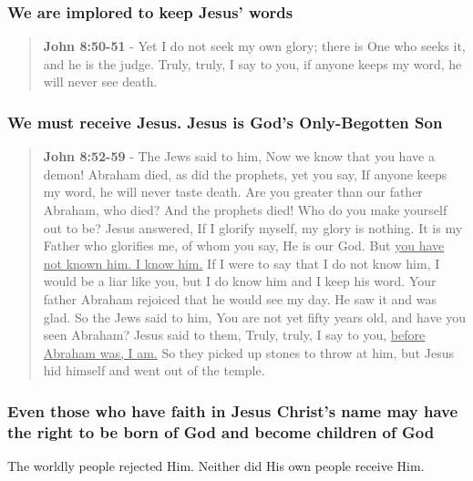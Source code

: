 \documentclass[11pt]{article}
\begin{document}
\subsubsection{We are implored to keep Jesus' words}
\label{sec:orgd95e0c0}
\begin{quote}
\textbf{John 8:50-51} - Yet I do not seek my own glory; there is One who seeks it, and he is the judge. Truly, truly, I say to you, if anyone keeps my word, he will never see death.
\end{quote}

\subsubsection{We must receive Jesus. Jesus is God's Only-Begotten Son}
\label{sec:orgecdaece}
\begin{quote}
\textbf{John 8:52-59} - The Jews said to him, Now we know that you have a demon! Abraham died, as did the prophets, yet you say, If anyone keeps my word, he will never taste death. Are you greater than our father Abraham, who died? And the prophets died! Who do you make yourself out to be? Jesus answered, If I glorify myself, my glory is nothing. It is my Father who glorifies me, of whom you say, He is our God. But \uline{you have not known him. I know him.} If I were to say that I do not know him, I would be a liar like you, but I do know him and I keep his word. Your father Abraham rejoiced that he would see my day. He saw it and was glad. So the Jews said to him, You are not yet fifty years old, and have you seen Abraham? Jesus said to them, Truly, truly, I say to you, \uline{before Abraham was, I am.} So they picked up stones to throw at him, but Jesus hid himself and went out of the temple.
\end{quote}

\subsubsection{Even those who have faith in Jesus Christ's name may have the right to be born of God and become children of God}
\label{sec:org1146481}
The worldly people rejected Him. Neither did His own people receive Him.
\end{document}
